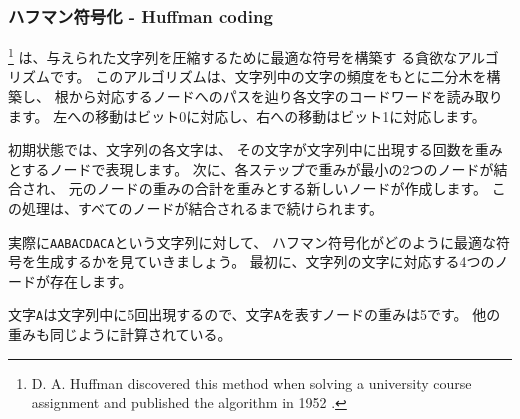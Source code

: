 
\subsubsection{ハフマン符号化 - Huffman coding}

\footnote{D. A. Huffman discovered this method
when solving a university course assignment
and published the algorithm in 1952 \cite{huf52}.}
は、与えられた文字列を圧縮するために最適な符号を構築す る貪欲なアルゴリズムです。
このアルゴリズムは、文字列中の文字の頻度をもとに二分木を構築し、
根から対応するノードへのパスを辿り各文字のコードワードを読み取ります。
左への移動はビット0に対応し、右への移動はビット1に対応します。

初期状態では、文字列の各文字は、
その文字が文字列中に出現する回数を重みとするノードで表現します。
次に、各ステップで重みが最小の2つのノードが結合され、
元のノードの重みの合計を重みとする新しいノードが作成します。
この処理は、すべてのノードが結合されるまで続けられます。

実際に\texttt{AABACDACA}という文字列に対して、
ハフマン符号化がどのように最適な符号を生成するかを見ていきましょう。
最初に、文字列の文字に対応する4つのノードが存在します。

\begin{center}
\end{center}

文字\texttt{A}は文字列中に5回出現するので、文字\texttt{A}を表すノードの重みは5です。
他の重みも同じように計算されている。

